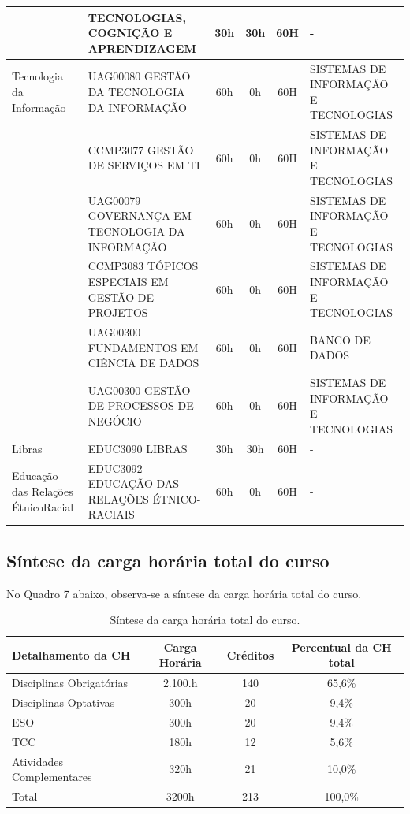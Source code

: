 \begin{center}
\begin{tiny}
\begin{longtable}{p{2.5cm}p{5.5cm}cccp{3.3cm}}
    & TECNOLOGIAS, COGNIÇÃO E APRENDIZAGEM & 30h & 30h & 60H & - \\ \midrule
  Tecnologia da Informação & UAG00080 GESTÃO DA TECNOLOGIA DA INFORMAÇÃO & 60h & 0h & 60H & SISTEMAS DE INFORMAÇÃO E TECNOLOGIAS \\ \cline{2-6}
    & CCMP3077 GESTÃO DE SERVIÇOS EM TI & 60h & 0h & 60H & SISTEMAS DE INFORMAÇÃO E TECNOLOGIAS \\ \cline{2-6}
    & UAG00079 GOVERNANÇA EM TECNOLOGIA DA INFORMAÇÃO & 60h & 0h & 60H & SISTEMAS DE INFORMAÇÃO E TECNOLOGIAS \\ \cline{2-6}
    & CCMP3083 TÓPICOS ESPECIAIS EM GESTÃO DE PROJETOS & 60h & 0h & 60H & SISTEMAS DE INFORMAÇÃO E TECNOLOGIAS \\ \cline{2-6}
    & UAG00300 FUNDAMENTOS EM CIÊNCIA DE DADOS & 60h & 0h & 60H & BANCO DE DADOS \\ \cline{2-6}
    & UAG00300 GESTÃO DE PROCESSOS DE NEGÓCIO & 60h & 0h & 60H & SISTEMAS DE INFORMAÇÃO E TECNOLOGIAS \\ \midrule
  Libras & EDUC3090 LIBRAS & 30h & 30h & 60H & - \\ \midrule
  Educação das Relações Étnico\-Racial & EDUC3092  EDUCAÇÃO DAS RELAÇÕES ÉTNICO-RACIAIS & 60h & 0h & 60H & - \\
\bottomrule
\end{longtable}
\end{tiny}      
\end{center}

\subsection{Síntese da carga horária total do curso}

No Quadro 7 abaixo, observa-se a síntese da carga horária total do curso.


\begin{center}
  
  \begin{tiny}
    \begin{longtable}{lccc}
      \caption{\label{quadro:sintese-carga-horaria-total-do-curso}Síntese da carga horária total do curso.}\\
    \toprule
    \textbf{Detalhamento da CH} & \textbf{Carga Horária} & \textbf{Créditos} & \textbf{Percentual da CH total}\\
    \midrule
    Disciplinas Obrigatórias & 2.100.h & 140 & 65,6\% \\ \midrule
    Disciplinas Optativas & 300h & 20 & 9,4\% \\ \midrule
    ESO & 300h & 20 & 9,4\% \\ \midrule
    TCC & 180h & 12 & 5,6\% \\ \midrule
    Atividades Complementares & 320h & 21 & 10,0\% \\ \midrule
    Total & 3200h & 213 & 100,0\% \\
\bottomrule
\end{longtable}
\end{tiny}      
\end{center}

